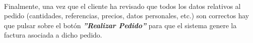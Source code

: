 \paragraph{}Finalmente, una vez que el cliente ha revisado que todos los datos relativos al pedido (cantidades, referencias, precios, datos personales, etc.) son correctos hay que pulsar sobre el botón \textbf{\textit{''Realizar Pedido''}} para que el sistema genere la factura asociada a dicho pedido.